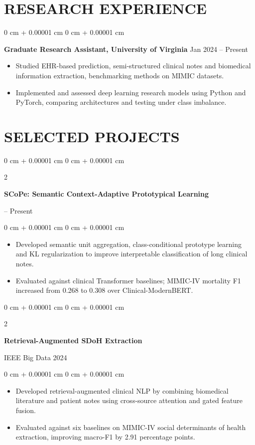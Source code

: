 \documentclass[10pt, letterpaper]{article}
\newenvironment{highlights}{
    \begin{itemize}[
        topsep=0.03 cm,
        parsep=0.03 cm,
        partopsep=0pt,
        itemsep=0pt,
        leftmargin=0 cm + 10pt
    ]
}{
    \end{itemize}
} %
\newenvironment{onecolentry}{
    \begin{adjustwidth}{
        0 cm + 0.00001 cm
    }{
        0 cm + 0.00001 cm
    }
}{
    \end{adjustwidth}
} %
\newenvironment{twocolentry}[2][]{
    \onecolentry
    \def\secondColumn{#2}
    \setcolumnwidth{\fill, 4.5 cm}
    \begin{paracol}{2}
}{
    \switchcolumn \raggedleft \secondColumn
    \end{paracol}
    \endonecolentry
} %
\begin{document}
\section{RESEARCH EXPERIENCE}
\begin{onecolentry}
\textbf{Graduate Research Assistant, University of Virginia} \hfill Jan 2024 -- Present
\begin{highlights}
\item Studied EHR-based prediction, semi-structured clinical notes and biomedical information extraction, benchmarking methods on MIMIC datasets.
\item Implemented and assessed deep learning research models using Python and PyTorch, comparing architectures and testing under class imbalance.
\end{highlights}
\end{onecolentry}
\section{SELECTED PROJECTS}
\begin{twocolentry}{2026 -- Present}
\textbf{SCoPe: Semantic Context-Adaptive Prototypical Learning}
\end{twocolentry}
\begin{onecolentry}
\begin{highlights}
\item Developed semantic unit aggregation, class-conditional prototype learning and KL regularization to improve interpretable classification of long clinical notes.
\item Evaluated against clinical Transformer baselines; MIMIC-IV mortality F1 increased from 0.268 to 0.308 over Clinical-ModernBERT.
\end{highlights}
\end{onecolentry}
\vspace{0.035 cm}

\begin{twocolentry}{IEEE Big Data 2024}
\textbf{Retrieval-Augmented SDoH Extraction}
\end{twocolentry}
\begin{onecolentry}
\begin{highlights}
\item Developed retrieval-augmented clinical NLP by combining biomedical literature and patient notes using cross-source attention and gated feature fusion.
\item Evaluated against six baselines on MIMIC-IV social determinants of health extraction, improving macro-F1 by 2.91 percentage points.
\end{highlights}
\end{onecolentry}
\vspace{0.035 cm}
\end{document}
